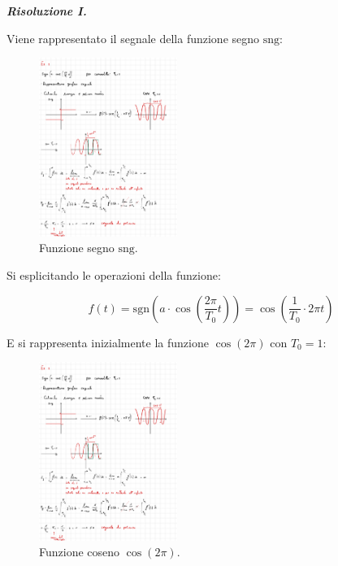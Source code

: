 \documentclass[a4paper]{article}
\begin{document}
	\noindent
	\textcolor{Green4}{\textbf{\emph{Risoluzione I.}}}
	
	\noindent
	Viene rappresentato il segnale della funzione segno $\mathrm{sng}$:
	
	\begin{figure}[!htp]
		\centering
		\includegraphics[width=0.4\textwidth]{img/ex_exam/sng_func_2.pdf}
		\caption{Funzione segno $\mathrm{sng}$.}
	\end{figure}

	\noindent
	Si esplicitando le operazioni della funzione:
	
	\begin{equation*}
		f(t) = \mathrm{sgn }\left(a\cdot\cos{\left(\dfrac{2\pi}{T_0} t\right)}\right) = \cos\left(\dfrac{1}{T_0}\cdot 2\pi t\right)
	\end{equation*}

	\noindent
	E si rappresenta inizialmente la funzione $\cos\left(2\pi\right)$ con $T_0 = 1$:
	
	\begin{figure}[!htp]
		\centering
		\includegraphics[width=0.4\textwidth]{img/ex_exam/sng_func_2-Mod.pdf}
		\caption{Funzione coseno $\cos\left(2\pi\right)$.}
	\end{figure}
\end{document}

